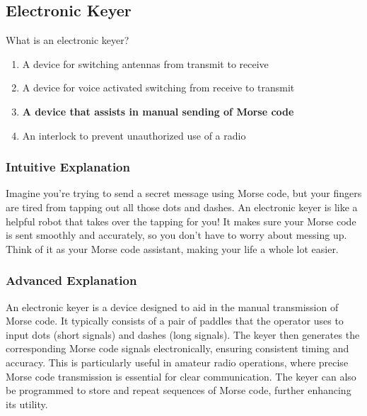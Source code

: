 \subsection{Electronic Keyer}
\label{T4A12}

\begin{tcolorbox}[colback=gray!10!white,colframe=black!75!black,title=T4A12]
What is an electronic keyer?  
\begin{enumerate}[label=\Alph*)]
    \item A device for switching antennas from transmit to receive
    \item A device for voice activated switching from receive to transmit
    \item \textbf{A device that assists in manual sending of Morse code}
    \item An interlock to prevent unauthorized use of a radio
\end{enumerate}
\end{tcolorbox}

\subsubsection*{Intuitive Explanation}
Imagine you're trying to send a secret message using Morse code, but your fingers are tired from tapping out all those dots and dashes. An electronic keyer is like a helpful robot that takes over the tapping for you! It makes sure your Morse code is sent smoothly and accurately, so you don't have to worry about messing up. Think of it as your Morse code assistant, making your life a whole lot easier.

\subsubsection*{Advanced Explanation}
An electronic keyer is a device designed to aid in the manual transmission of Morse code. It typically consists of a pair of paddles that the operator uses to input dots (short signals) and dashes (long signals). The keyer then generates the corresponding Morse code signals electronically, ensuring consistent timing and accuracy. This is particularly useful in amateur radio operations, where precise Morse code transmission is essential for clear communication. The keyer can also be programmed to store and repeat sequences of Morse code, further enhancing its utility.

